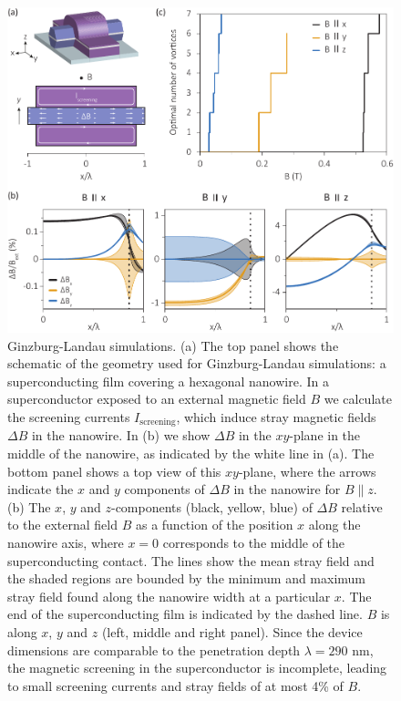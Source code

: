 \begin{figure}
\begin{center}
\centering
\includegraphics[width=\columnwidth]{chapter_spinorbit/figures/SFig2_GL.pdf}
\caption{\label{fig:GL}
Ginzburg-Landau simulations.
(a) The top panel shows the schematic of the geometry used for Ginzburg-Landau simulations: a superconducting film covering a hexagonal nanowire.
In a superconductor exposed to an external magnetic field $B$ we calculate the screening currents $I_{\mathrm{screening}}$, which induce stray magnetic fields $\Delta B$ in the nanowire.
In (b) we show $\Delta B$ in the $xy$-plane in the middle of the nanowire, as indicated by the white line in (a).
The bottom panel shows a top view of this $xy$-plane, where the arrows indicate the $x$ and $y$ components of $\Delta B$ in the nanowire for $B \parallel z$.
(b) The $x$, $y$ and $z$-components (black, yellow, blue) of $\Delta B$ relative to the external field $B$ as a function of the position $x$ along the nanowire axis, where $x = 0$ corresponds to the middle of the superconducting contact.
The lines show the mean stray field and the shaded regions are bounded by the minimum and maximum stray field found along the nanowire width at a particular $x$.
 The end of the superconducting film is indicated by the dashed line.
 $B$ is along $x$, $y$ and $z$ (left, middle and right panel).
Since the device dimensions are comparable to the penetration depth $\lambda = 290$ nm, the magnetic screening in the superconductor is incomplete, leading to small screening currents and stray fields of at most 4\% of $B$.
}
\end{center}
\end{figure}
